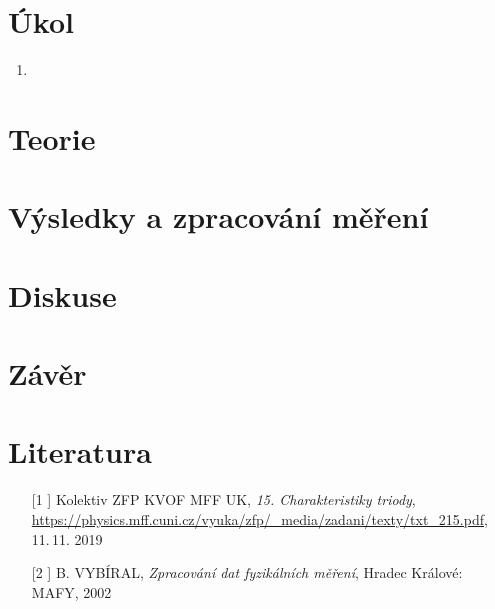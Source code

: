 \documentclass[10pt,a4paper]{article}
\begin{document}
\newpage
{}
\setcounter{page}{1}



\section{Úkol}
\begin{enumerate}
\item <++>

\end{enumerate}

\section{Teorie}


\section{Výsledky a zpracování měření}


\section{Diskuse}



\section{Závěr}





\section{Literatura}
\begin{itemize}
\item[[1\hspace*{-0.18cm}]] Kolektiv ZFP KVOF MFF UK, \emph{15. Charakteristiky triody}, \url{https://physics.mff.cuni.cz/vyuka/zfp/_media/zadani/texty/txt_215.pdf}, 11.\,11. 2019
\item[[2\hspace*{-0.18cm}]] B. VYBÍRAL, \emph{Zpracování dat fyzikálních měření}, Hradec Králové: MAFY, 2002
\end{itemize}
\end{document}
